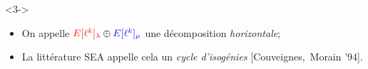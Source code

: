 \documentclass[10pt,a4paper]{beamer}
\theoremstyle{plain}
\theoremstyle{definition}
\theoremstyle{definition}
\theoremstyle{definition}
\theoremstyle{definition}
\theoremstyle{remark}
\theoremstyle{remark}
\theoremstyle{definition}
\def\red#1{\textcolor{red}{#1}}
\def\blu#1{\textcolor{blue}{#1}}
\begin{document}
\begin{frame}
\begin{figure}[h]
\begin{center}
    \end{center}
  \end{figure}
\vspace{-4.5mm}
  \begin{uncoverenv}<3->
    \begin{itemize}
    \item On appelle $\red{E[\ell^k]_\lambda}\oplus\blu{E[\ell^k]_\mu}$ une
     décomposition \emph{horizontale};
    \item La littérature SEA appelle cela un \emph{cycle d'isogénies} [Couveignes,~Morain '94].%
    \end{itemize}
  \end{uncoverenv}

\end{frame}

\end{document}

